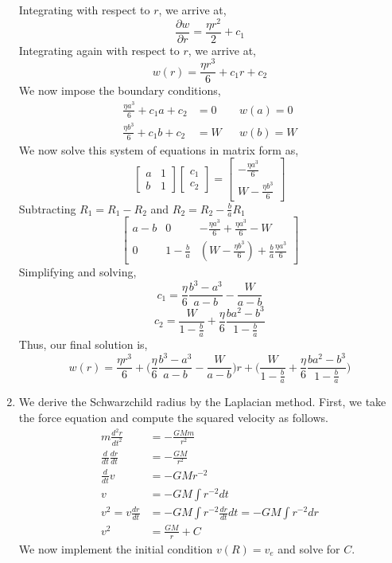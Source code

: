 \documentclass[letterpaper,10pt]{article}
\begin{document}
\begin{enumerate}
Integrating with respect to $r$, we arrive at,
\[\frac{\partial w}{\partial r} = \frac{\eta r^2}{2}+c_1\]
Integrating again with respect to $r$, we arrive at,
\[w(r) = \frac{\eta r^3}{6}+c_1r+c_2\]
We now impose the boundary conditions,
\begin{align*}
\frac{\eta a^3}{6}+c_1 a+c_2 &= 0 && w(a)=0\\
\frac{\eta b^3}{6}+c_1 b+c_2 &= W && w(b)=W
\end{align*}
We now solve this system of equations in matrix form as,
\[\begin{bmatrix}
a & 1 \\
b & 1
\end{bmatrix}\begin{bmatrix}
c_1\\
c_2
\end{bmatrix}=\begin{bmatrix}
-\frac{\eta a^3}{6}\\
W-\frac{\eta b^3}{6}
\end{bmatrix} \]
Subtracting $R_1=R_1-R_2$ and $R_2=R_2-\frac{b}{a}R_1$
\[\left[ \begin{array}{cc|c}
a-b & 0 & -\frac{\eta a^3}{6}+\frac{\eta a^3}{6}-W\\
0 & 1-\frac{b}{a} & (W-\frac{\eta b^3}{6})+\frac{b}{a}\frac{\eta a^3}{6}
\end{array}\right]\]
Simplifying and solving,
\[c_1 =\frac{\eta}{6}\frac{b^3-a^3}{a-b}-\frac{W}{a-b}\]
\[c_2 = \frac{W}{1-\frac{b}{a}}+\frac{\eta}{6}\frac{ba^2-b^3}{1-\frac{b}{a}}\]
Thus, our final solution is,
\[w(r) = \frac{\eta r^3}{6}+\bigg(\frac{\eta}{6}\frac{b^3-a^3}{a-b}-\frac{W}{a-b}\bigg)r+\bigg(\frac{W}{1-\frac{b}{a}}+\frac{\eta}{6}\frac{ba^2-b^3}{1-\frac{b}{a}}\bigg)\]
\item We derive the Schwarzchild radius by the Laplacian method. First, we take the force equation and compute the squared velocity as follows.
\begin{align*}
m\frac{d^2r}{dt^2} &= -\frac{GMm}{r^2}\\
\frac{d}{dt}\frac{dr}{dt} &= -\frac{GM}{r^2}\\
\frac{d}{dt}v &= -GMr^{-2}\\
v &= -GM\int r^{-2} dt\\
v^2=v\frac{dr}{dt} &= -GM\int r^{-2} \frac{dr}{dt}dt=-GM\int r^{-2}dr\\
v^2 &= \frac{GM}{r}+C
\end{align*}
We now implement the initial condition $v(R)=v_e$ and solve for $C$.
\begin{align*}

\end{align*}
\end{enumerate}
\end{document}
